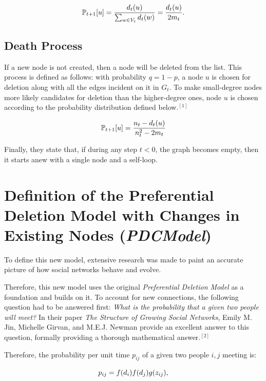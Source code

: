 \documentclass[final,3p,times,twocolumn]{elsarticle}
\begin{document}
\begin{equation}
\centering
    \mathbb{P}_{t + 1}[u] = \frac{d_t(u)}{\sum_{w \in V_t} d_t(w)} = \frac{d_t(u)}{2m_t}.
\end{equation}

\subsection{Death Process}

If a new node is not created, then a node will be deleted from the list. This process is defined as follows: with probability $q = 1 - p$, a node $u$ is chosen for deletion along with all the edges incident on it in $G_t$. To make small-degree nodes more likely candidates for deletion than the higher-degree ones, node $u$ is chosen according to the probability distribution defined below.$^{[1]}$

\begin{equation}
\centering
    \mathbb{P}_{t + 1}[u] = \frac{n_t - d_t(u)}{n^2_t - 2m_t}
\end{equation}

Finally, they state that, if during any step $t < 0$, the graph becomes empty, then it starts anew with a single node and a self-loop.

\section{Definition of the Preferential Deletion Model with Changes in Existing Nodes (\textit{PDCModel})}
\label{S:4}

To define this new model, extensive research was made to paint an accurate picture of how social networks behave and evolve.

Therefore, this new model uses the original \textit{Preferential Deletion Model} as a foundation and builds on it. To account for new connections, the following question had to be answered first: \textit{What is the probability that a given two people will meet?} In their paper \textit{The Structure of Growing Social Networks}, Emily M. Jin, Michelle Girvan, and M.E.J. Newman provide an excellent answer to this question, formally providing a thorough mathematical answer.$^{[2]}$

Therefore, the probability per unit time $p_{ij}$ of a given two people $i, j$ meeting is:

\begin{equation}
\centering
    p_{ij} = f(d_i)f(d_j)g(z_{ij}),
\end{equation}
\end{document}
